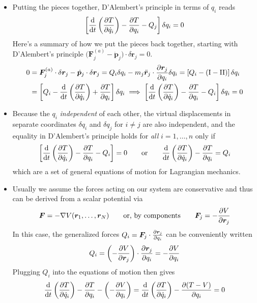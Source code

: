 \documentclass[11pt, a4paper]{article}
\newcommand{\eqtext}[1]{\qquad \text{#1} \qquad}
\newcommand{\bdot}[1]{\dot{\bm{#1}}}
\newcommand{\bddot}[1]{\ddot{\bm{#1}}}
\renewcommand{\grad}{\nabla }
\begin{document}
\begin{itemize}
	\item Putting the pieces together, D'Alembert's principle in terms of $ q_{i} $ reads
	\begin{equation*}
		\left[\dv{}{t} \left(\pdv{T}{\dot{q}_{i}}\right) - \pdv{T}{q_{i}} - Q_{j}\right]\delta q_{i} = 0
	\end{equation*}
	Here's a summary of how we put the pieces back together, starting with D'Alembert's principle $ \big (\bm{F}_{j}^{(a)} - \bdot{p}_{j}\big)\cdot \delta \bm{r}_{j} = 0 $. \vspace{-3mm} 
	\begin{align*}
		0 &=\bm{F}_{j}^{(a)}\cdot \delta \bm{r}_{j} - \bdot{p}_{j}\cdot \delta \bm{r}_{j} =  Q_{i}\delta q_{i} - m_{j}  \bddot{r}_{j} \cdot \pdv{\bm{r}_{j}}{q_{i}} \delta q_{i} = \left[Q_{i} - (\mathrm{I} - \mathrm{II})\right] \delta q_{i}\\
		&= \left[Q_{i} - \dv{}{t}\left(\pdv{T}{\dot{q}_{i}}\right) +  \pdv{T}{q_{i}} \right] \delta q_{i} \implies \left[\dv{}{t} \left(\pdv{T}{\dot{q}_{i}}\right) - \pdv{T}{q_{i}} - Q_{i}\right]\delta q_{i} = 0
	\end{align*}
	
	\item Because the $ q_{i} $ \textit{independent} of each other, the virtual displacements in separate coordinates $ \delta q_{i} $ and $ \delta q_{j} $ for $ i \neq j $ are also independent, and the equality in D'Alembert's principle holds for \textit{all} $ i = 1, \ldots, n $ only if
	\begin{equation*}
		\left[\dv{}{t} \left(\pdv{T}{\dot{q}_{i}}\right) - \pdv{T}{q_{i}} - Q_{i}\right] = 0 \eqtext{or} \dv{}{t} \left(\pdv{T}{\dot{q}_{i}}\right) - \pdv{T}{q_{i}} = Q_{i}
	\end{equation*}
	which are a set of general equations of motion for Lagrangian mechanics.

	\item Usually we assume the forces acting on our system are conservative and thus can be derived from a scalar potential via 
	\begin{equation*}
		\bm{F} = - \grad{V}(\bm{r}_{1}, \ldots, \bm{r}_{N}) \eqtext{or, by components} \bm{F}_{j} = - \pdv{V}{\bm{r}_{j}}
	\end{equation*}
	In this case, the generalized forces $ Q_{i} = \bm{F}_{j} \cdot \pdv{\bm{r}_{j}}{q_{i}} $ can be conveniently written
	\begin{equation*}
		Q_{i} = \left(- \pdv{V}{\bm{r}_{j}}\right) \cdot \pdv{\bm{r}_{j}}{q_{i}} = - \pdv{V}{q_{i}}
	\end{equation*}
	Plugging $ Q_{i} $ into the equations of motion then gives
	\begin{equation*}
		\dv{}{t} \left(\pdv{T}{\dot{q}_{i}}\right) - \pdv{T}{q_{i}} - \left(- \pdv{V}{q_{i}} \right) = \dv{}{t} \left(\pdv{T}{\dot{q}_{i}}\right) - \pdv{(T - V)}{q_{i}} = 0
	\end{equation*}
	

\end{itemize}
\end{document}
